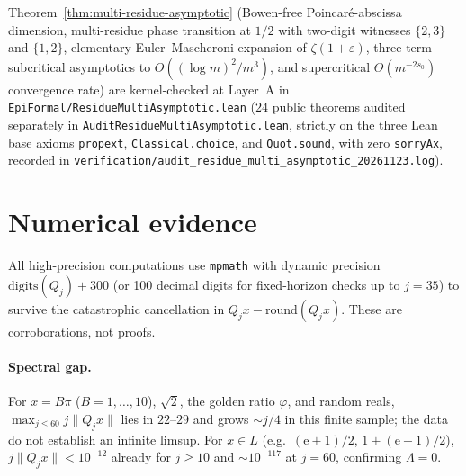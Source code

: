 \documentclass[11pt]{article}
\theoremstyle{definition}
\theoremstyle{remark}
\newcommand{\ee}{\mathrm{e}}
\newcommand{\Lam}{\Lambda}
\begin{document}
Theorem~\ref{thm:multi-residue-asymptotic} (Bowen-free Poincar\'e-abscissa dimension, multi-residue phase transition at $1/2$ with two-digit witnesses $\{2,3\}$ and $\{1,2\}$, elementary Euler--Mascheroni expansion of $\zeta(1+\varepsilon)$, three-term subcritical asymptotics to $O((\log m)^2/m^3)$, and supercritical $\Theta(m^{-2s_0})$ convergence rate) are kernel-checked at Layer~A in \texttt{EpiFormal/\allowbreak ResidueMultiAsymptotic.lean} ($24$ public theorems audited separately in \texttt{AuditResidueMultiAsymptotic.lean}, strictly on the three Lean base axioms \texttt{propext}, \texttt{Classical.choice}, and \texttt{Quot.sound}, with zero \texttt{sorryAx}, recorded in \texttt{verification/\allowbreak audit\_\allowbreak residue\_\allowbreak multi\_\allowbreak asymptotic\_\allowbreak 20261123.log}).



\section{Numerical evidence}\label{sec:num}

All high-precision computations use \texttt{mpmath} with dynamic precision
$\mathrm{digits}(Q_j)+300$ (or 100 decimal digits for fixed-horizon checks up
to $j=35$) to survive the catastrophic cancellation in
$Q_jx-\mathrm{round}(Q_jx)$. These are corroborations, not proofs.

\paragraph{Spectral gap.} For $x=B\pi$ ($B=1,\dots,10$), $\sqrt2$, the golden
ratio $\varphi$, and random reals, $\max_{j\le60}j\|Q_jx\|$ lies in $22$--$29$
and grows $\sim j/4$ in this finite sample; the data do not establish an
infinite limsup. For $x\in L$ (e.g.\ $(\ee+1)/2$, $1+(\ee+1)/2$),
$j\|Q_jx\|<10^{-12}$ already for $j\ge10$ and $\sim10^{-117}$ at $j=60$,
confirming $\Lam=0$.
\end{document}

